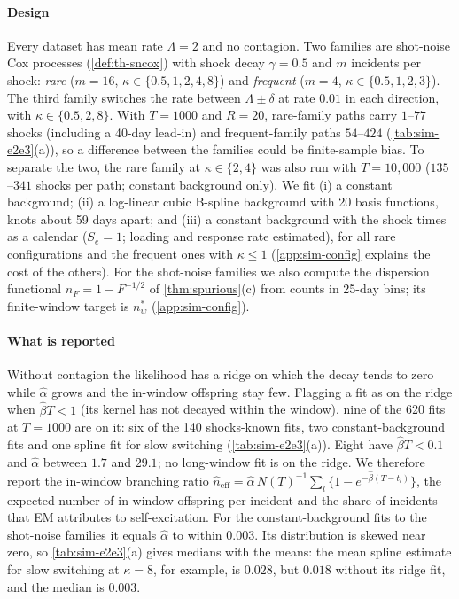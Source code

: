 \paragraph{Design} Every dataset has mean rate $\Lambda=2$ and no contagion. Two families
are shot-noise Cox processes (\cref{def:th-sncox}) with shock decay $\gamma=0.5$ and $m$
incidents per shock: \emph{rare} ($m=16$, $\kappa\in\{0.5,1,2,4,8\}$) and \emph{frequent}
($m=4$, $\kappa\in\{0.5,1,2,3\}$). The third family switches the rate between
$\Lambda\pm\delta$ at rate $0.01$ in each direction, with $\kappa\in\{0.5,2,8\}$. With
$T=1000$ and $R=20$, rare-family paths carry $1$--$77$ shocks (including a 40-day lead-in)
and frequent-family paths $54$--$424$ (\cref{tab:sim-e2e3}(a)), so a difference between the
families could be finite-sample bias. To separate the two, the rare family at
$\kappa\in\{2,4\}$ was also run with $T=10{,}000$ ($135$--$341$ shocks per path; constant
background only). We fit (i) a constant background; (ii) a log-linear cubic
B-spline background with 20 basis functions, knots about 59 days apart; and (iii) a constant
background with the shock times as a calendar ($S_e=1$; loading and response rate
estimated), for all rare configurations and the frequent ones with $\kappa\le1$
(\cref{app:sim-config} explains the cost of the others). For the shot-noise families we also
compute the dispersion functional $n_F=1-F^{-1/2}$ of \cref{thm:spurious}(c) from counts in
25-day bins; its finite-window target is $n^*_w$ (\cref{app:sim-config}).

\paragraph{What is reported} Without contagion the likelihood has a ridge on which the decay
tends to zero while $\hat\alpha$ grows and the in-window offspring stay few. Flagging a fit
as on the ridge when $\hat\beta T<1$ (its kernel has not decayed within the window), nine
of the 620 fits at $T=1000$ are on it: six of the 140 shocks-known fits, two
constant-background fits and one spline fit for slow switching (\cref{tab:sim-e2e3}(a)).
Eight have $\hat\beta T<0.1$ and $\hat\alpha$ between $1.7$ and $29.1$; no long-window fit
is on the ridge. We therefore report the in-window branching ratio
$\hat n_{\mathrm{eff}}=\hat\alpha\,N(T)^{-1}\sum_l\{1-e^{-\hat\beta(T-t_l)}\}$, the expected
number of in-window offspring per incident and the share of incidents that EM attributes to
self-excitation. For the constant-background fits to the shot-noise families it equals
$\hat\alpha$ to within $0.003$. Its distribution is skewed near zero, so
\cref{tab:sim-e2e3}(a) gives medians with the means: the mean spline estimate for slow
switching at $\kappa=8$, for example, is $0.028$, but $0.018$ without its ridge fit, and the
median is $0.003$.

